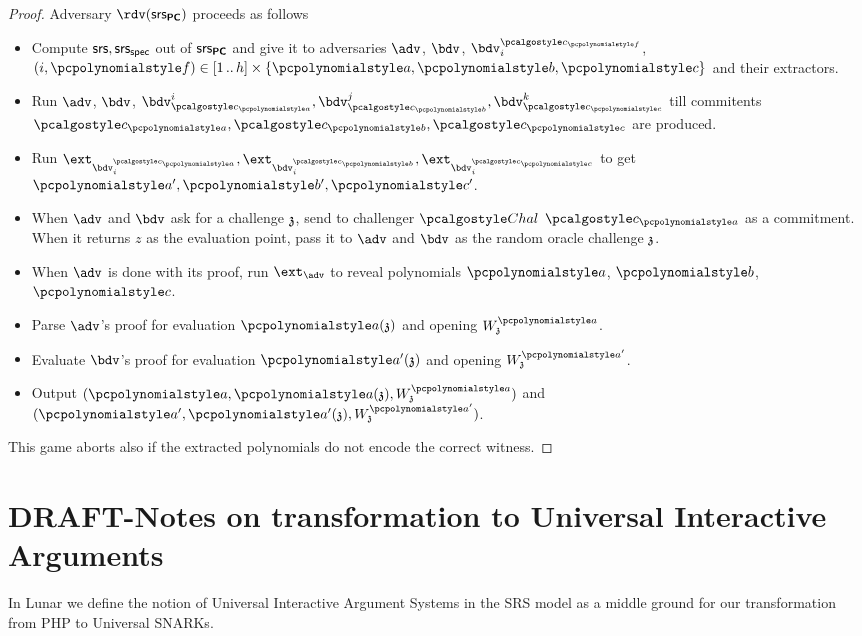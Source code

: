 \documentclass[runningheads,11pt]{llncs}
\begin{document}
\begin{proof}
  Adversary $\rdv(\srs_{\PCOM})$ proceeds as follows
  \begin{itemize}
  \item Compute $\mathsf{srs}, \mathsf{srs_{spec}}$ out of $\mathsf{srs}_{\bm{\mathsf{PC}}}$ and give it to adversaries
    $\adv$, $\bdv$, $\bdv^{\cp{f}}_i$,
    $(i, \pf) \in \range{1}{h} \times \smallset{\p{a}, \p{b}, \p{c}}$ and their
    extractors.
  \item Run $\adv$, $\bdv$,
    $\bdv_{\cp{a}}^{i}, \bdv_{\cp{b}}^{j}, \bdv_{\cp{c}}^{k}$ till commitents
    $\cp{a}, \cp{b}, \cp{c}$ are produced. 
  \item Run $\ext_{\bdv^{\cp{a}}_i}, \ext_{\bdv^{\cp{b}}_i},
    \ext_{\bdv^{\cp{c}}_i}$ to get $\p{a'}, \p{b'}, \p{c'}$.
  \item When $\adv$ and $\bdv$ ask for a challenge $\mathfrak{z}$, send to challenger
    $\challenger$ $\cp{a}$ as a commitment. When it returns $z$ as the
    evaluation point, pass it to $\adv$ and $\bdv$ as the random oracle
    challenge $\mathfrak{z}$.
  \item When $\adv$ is done with its proof, run $\ext_{\adv}$ to reveal
    polynomials $\p{a}$, ${\p{b}}$, $\p{c}$. 
  \item Parse $\adv$'s proof for evaluation $\p{a}(\chz)$ and opening
    $W_{\chz}^{\p{a}}$.
  \item Evaluate $\bdv$'s proof for evaluation $\p{a'}(\chz)$ and opening
    $W_{\chz}^{\p{a'}}$.
  \item Output $(\p{a}, \p{a}(\chz), W^{\p{a}}_\chz)$ and $(\p{a'},
    \p{a'}(\chz), W^{\p{a'}}_\chz)$. 
  \end{itemize}
  
  This game aborts also if the extracted polynomials do not encode the correct
  witness.


  \end{proof}
  
\section{DRAFT-Notes on transformation to Universal Interactive Arguments}

In Lunar we define the notion of Universal Interactive Argument Systems in the SRS model
as a middle ground for our transformation from PHP to Universal SNARKs.
\end{document}
